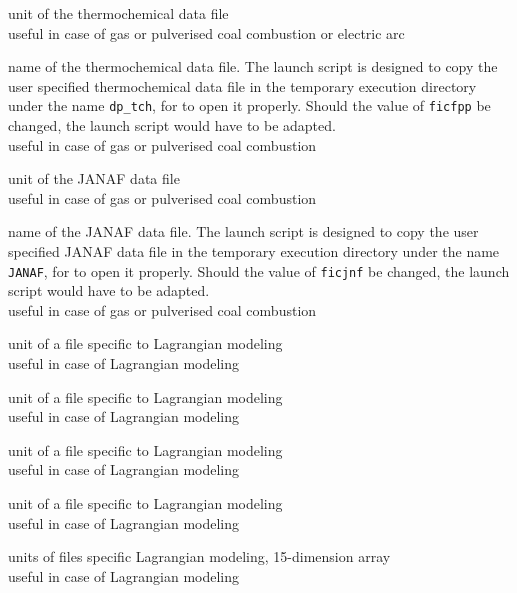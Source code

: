 
{unit of the thermochemical data file\\
useful in case of gas or pulverised coal combustion or electric arc}

{name of the thermochemical data file. The launch script is designed to copy the
user specified thermochemical data file in the temporary execution directory
under the name \texttt{dp\_tch}, for \CS to open it properly. Should the value
of {\tt ficfpp} be changed, the launch script would have to be adapted.\\
useful in case of gas or pulverised coal combustion}

{unit of the JANAF data file\\
useful in case of gas or pulverised coal combustion}

{name of the JANAF data file. The launch script is designed to copy the
user specified JANAF data file in the temporary execution directory
under the name \texttt{JANAF}, for \CS to open it properly. Should the value
of {\tt ficjnf} be changed, the launch script would have to be adapted.\\
useful in case of gas or pulverised coal combustion}


{unit of a file specific to Lagrangian modeling\\
useful in case of Lagrangian modeling}

{unit of a file specific to Lagrangian modeling\\
useful in case of Lagrangian modeling}

{unit of a file specific to Lagrangian modeling\\
useful in case of Lagrangian modeling}

{unit of a file specific to Lagrangian modeling\\
useful in case of Lagrangian modeling}

{units of files specific Lagrangian modeling, 15-dimension array\\
useful in case of Lagrangian modeling}


